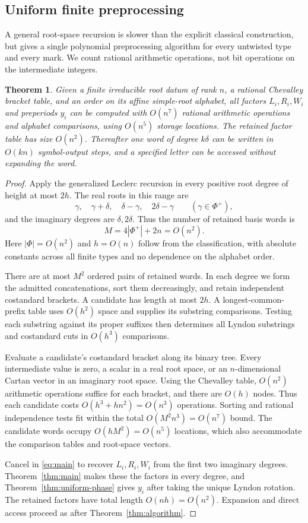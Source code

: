 \documentclass[11pt]{amsart}
\numberwithin{equation}{section}
\newtheorem{theorem}{Theorem}[section]
\theoremstyle{definition}
\begin{document}
\subsection{Uniform finite preprocessing}
A general root-space recursion is slower than the explicit classical construction, but gives a single polynomial preprocessing algorithm for every untwisted type and every mark. We count rational arithmetic operations, not bit operations on the intermediate integers.

\begin{theorem}\label{thm:uniform-algorithm}
Given a finite irreducible root datum of rank $n$, a rational Chevalley bracket table, and an order on its affine simple-root alphabet, all factors $L_i,R_i,W_i$ and preperiods $y_i$ can be computed with $O(n^7)$ rational arithmetic operations and alphabet comparisons, using $O(n^5)$ storage locations. The retained factor table has size $O(n^2)$. Thereafter one word of degree $k\delta$ can be written in $O(kn)$ symbol-output steps, and a specified letter can be accessed without expanding the word.
\end{theorem}
\begin{proof}
Apply the generalized Leclerc recursion in every positive root degree of height at most $2h$. The real roots in this range are
\[
 \gamma,\quad\gamma+\delta,\quad\delta-\gamma,\quad2\delta-\gamma
 \qquad(\gamma\in\Phi^+),
\]
and the imaginary degrees are $\delta,2\delta$. Thus the number of retained basis words is
\[
 M=4|\Phi^+|+2n=O(n^2).
\]
Here $|\Phi|=O(n^2)$ and $h=O(n)$ follow from the classification, with absolute constants across all finite types and no dependence on the alphabet order.

There are at most $M^2$ ordered pairs of retained words. In each degree we form the admitted concatenations, sort them decreasingly, and retain independent costandard brackets. A candidate has length at most $2h$. A longest-common-prefix table uses $O(h^2)$ space and supplies its substring comparisons. Testing each substring against its proper suffixes then determines all Lyndon substrings and costandard cuts in $O(h^3)$ comparisons.

Evaluate a candidate's costandard bracket along its binary tree. Every intermediate value is zero, a scalar in a real root space, or an $n$-dimensional Cartan vector in an imaginary root space. Using the Chevalley table, $O(n^2)$ arithmetic operations suffice for each bracket, and there are $O(h)$ nodes. Thus each candidate costs $O(h^3+hn^2)=O(n^3)$ operations. Sorting and rational independence tests fit within the total $O(M^2n^3)=O(n^7)$ bound. The candidate words occupy $O(hM^2)=O(n^5)$ locations, which also accommodate the comparison tables and root-space vectors.

Cancel in \eqref{eq:main} to recover $L_i,R_i,W_i$ from the first two imaginary degrees. Theorem~\ref{thm:main} makes these the factors in every degree, and Theorem~\ref{thm:uniform-phase} gives $y_i$ after taking the unique Lyndon rotation. The retained factors have total length $O(nh)=O(n^2)$. Expansion and direct access proceed as after Theorem~\ref{thm:algorithm}.
\end{proof}
\end{document}
